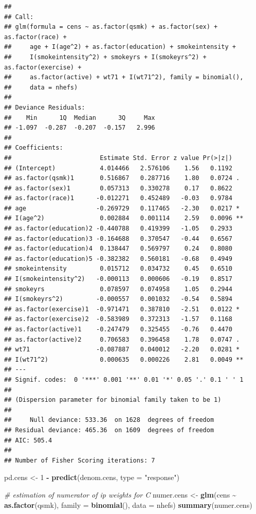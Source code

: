 \documentclass[
  10pt,
]{book}
\newenvironment{Shaded}{\begin{snugshade}}{\end{snugshade}}
\newcommand{\CommentTok}[1]{\textcolor[rgb]{0.56,0.35,0.01}{\textit{#1}}}
\newcommand{\DataTypeTok}[1]{\textcolor[rgb]{0.13,0.29,0.53}{#1}}
\newcommand{\DecValTok}[1]{\textcolor[rgb]{0.00,0.00,0.81}{#1}}
\newcommand{\KeywordTok}[1]{\textcolor[rgb]{0.13,0.29,0.53}{\textbf{#1}}}
\newcommand{\NormalTok}[1]{#1}
\newcommand{\OperatorTok}[1]{\textcolor[rgb]{0.81,0.36,0.00}{\textbf{#1}}}
\newcommand{\StringTok}[1]{\textcolor[rgb]{0.31,0.60,0.02}{#1}}
\begin{document}
\begin{verbatim}
## 
## Call:
## glm(formula = cens ~ as.factor(qsmk) + as.factor(sex) + as.factor(race) + 
##     age + I(age^2) + as.factor(education) + smokeintensity + 
##     I(smokeintensity^2) + smokeyrs + I(smokeyrs^2) + as.factor(exercise) + 
##     as.factor(active) + wt71 + I(wt71^2), family = binomial(), 
##     data = nhefs)
## 
## Deviance Residuals: 
##    Min      1Q  Median      3Q     Max  
## -1.097  -0.287  -0.207  -0.157   2.996  
## 
## Coefficients:
##                        Estimate Std. Error z value Pr(>|z|)   
## (Intercept)            4.014466   2.576106    1.56   0.1192   
## as.factor(qsmk)1       0.516867   0.287716    1.80   0.0724 . 
## as.factor(sex)1        0.057313   0.330278    0.17   0.8622   
## as.factor(race)1      -0.012271   0.452489   -0.03   0.9784   
## age                   -0.269729   0.117465   -2.30   0.0217 * 
## I(age^2)               0.002884   0.001114    2.59   0.0096 **
## as.factor(education)2 -0.440788   0.419399   -1.05   0.2933   
## as.factor(education)3 -0.164688   0.370547   -0.44   0.6567   
## as.factor(education)4  0.138447   0.569797    0.24   0.8080   
## as.factor(education)5 -0.382382   0.560181   -0.68   0.4949   
## smokeintensity         0.015712   0.034732    0.45   0.6510   
## I(smokeintensity^2)   -0.000113   0.000606   -0.19   0.8517   
## smokeyrs               0.078597   0.074958    1.05   0.2944   
## I(smokeyrs^2)         -0.000557   0.001032   -0.54   0.5894   
## as.factor(exercise)1  -0.971471   0.387810   -2.51   0.0122 * 
## as.factor(exercise)2  -0.583989   0.372313   -1.57   0.1168   
## as.factor(active)1    -0.247479   0.325455   -0.76   0.4470   
## as.factor(active)2     0.706583   0.396458    1.78   0.0747 . 
## wt71                  -0.087887   0.040012   -2.20   0.0281 * 
## I(wt71^2)              0.000635   0.000226    2.81   0.0049 **
## ---
## Signif. codes:  0 '***' 0.001 '**' 0.01 '*' 0.05 '.' 0.1 ' ' 1
## 
## (Dispersion parameter for binomial family taken to be 1)
## 
##     Null deviance: 533.36  on 1628  degrees of freedom
## Residual deviance: 465.36  on 1609  degrees of freedom
## AIC: 505.4
## 
## Number of Fisher Scoring iterations: 7
\end{verbatim}

\begin{Shaded}
\begin{Highlighting}[]
\NormalTok{pd.cens \textless{}{-}}\StringTok{ }\DecValTok{1} \OperatorTok{{-}}\StringTok{ }\KeywordTok{predict}\NormalTok{(denom.cens, }\DataTypeTok{type =} \StringTok{"response"}\NormalTok{)}

\CommentTok{\# estimation of numerator of ip weights for C}
\NormalTok{numer.cens \textless{}{-}}
\StringTok{  }\KeywordTok{glm}\NormalTok{(cens }\OperatorTok{\textasciitilde{}}\StringTok{ }\KeywordTok{as.factor}\NormalTok{(qsmk), }\DataTypeTok{family =} \KeywordTok{binomial}\NormalTok{(), }\DataTypeTok{data =}\NormalTok{ nhefs)}
\KeywordTok{summary}\NormalTok{(numer.cens)}
\end{Highlighting}
\end{Shaded}
\end{document}
